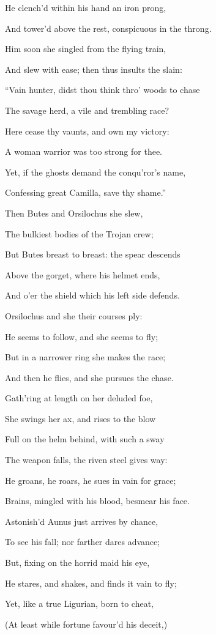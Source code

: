 He clench’d within his hand an iron prong,

And tower’d above the rest, conspicuous in the throng.

Him soon she singled from the flying train,

And slew with ease; then thus insults the slain:

“Vain hunter, didst thou think thro’ woods to chase

The savage herd, a vile and trembling race?

Here cease thy vaunts, and own my victory:

A woman warrior was too strong for thee.

Yet, if the ghosts demand the conqu’ror’s name,

Confessing great Camilla, save thy shame.”

Then Butes and Orsilochus she slew,

The bulkiest bodies of the Trojan crew;

But Butes breast to breast: the spear descends

Above the gorget, where his helmet ends,

And o’er the shield which his left side defends.

Orsilochus and she their courses ply:

He seems to follow, and she seems to fly;

But in a narrower ring she makes the race;

And then he flies, and she pursues the chase.

Gath’ring at length on her deluded foe,

She swings her ax, and rises to the blow

Full on the helm behind, with such a sway

The weapon falls, the riven steel gives way:

He groans, he roars, he sues in vain for grace;

Brains, mingled with his blood, besmear his face.

Astonish’d Aunus just arrives by chance,

To see his fall; nor farther dares advance;

But, fixing on the horrid maid his eye,

He stares, and shakes, and finds it vain to fly;

Yet, like a true Ligurian, born to cheat,

(At least while fortune favour’d his deceit,)

